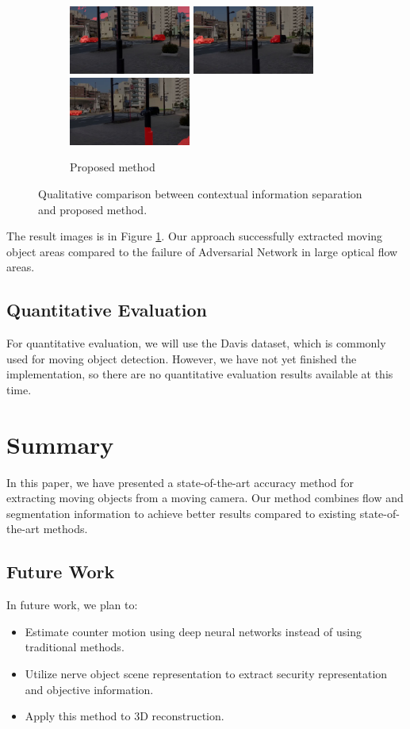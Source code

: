 \documentclass[10pt, twocolumn]{article}
\begin{document}
\begin{figure}[ht]
\begin{subfigure}{0.25\textwidth}
    \includegraphics[width=4cm]{fig/proposed/00020.jpg}
    \includegraphics[width=4cm]{fig/proposed/00030.jpg}
    \includegraphics[width=4cm]{fig/proposed/00040.jpg}
    \caption{Proposed method}
  \end{subfigure}
  
  \caption{Qualitative comparison between contextual information separation and proposed method.}
  \label{fig:comparison}
\end{figure}

The result images is in Figure \ref{fig:comparison}.
Our approach successfully extracted moving object areas compared to the failure of Adversarial Network in large optical flow areas.


\subsection{Quantitative Evaluation}
For quantitative evaluation, we will use the Davis dataset, which is commonly used for moving object detection.
However, we have not yet finished the implementation, so there are no quantitative evaluation results available at this time.


\section{Summary}
In this paper, we have presented a state-of-the-art accuracy method for extracting moving objects from a moving camera.
Our method combines flow and segmentation information to achieve better results compared to existing state-of-the-art methods.

\subsection{Future Work}
In future work, we plan to:

\begin{itemize}
  \item Estimate counter motion using deep neural networks instead of using traditional methods.
  \item Utilize nerve object scene representation to extract security representation and objective information.
  \item Apply this method to 3D reconstruction.
\end{itemize}



\end{document}
